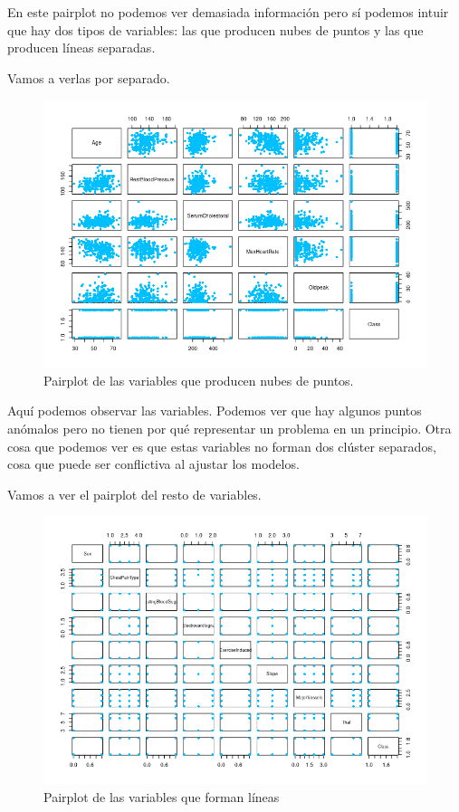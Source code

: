 \documentclass[12pt,a4paper]{article}
\begin{document}
En este pairplot no podemos ver demasiada información pero sí podemos intuir que hay dos tipos de variables: las que producen nubes de puntos y las que producen líneas separadas.

Vamos a verlas por separado.

\begin{figure}[H]
	\centering
	\includegraphics[scale=0.9]{./Imagenes/EDA/Clasificacion/pairplot_seleccionadas.png}
	\caption{Pairplot de las variables que producen nubes de puntos.}
\end{figure}

Aquí podemos observar las variables. Podemos ver que hay algunos puntos anómalos pero no tienen por qué representar un problema en un principio. Otra cosa que podemos ver es que estas variables no forman dos clúster separados, cosa que puede ser conflictiva al ajustar los modelos.

Vamos a ver el pairplot del resto de variables.

\begin{figure}[H]
	\centering
	\includegraphics[scale=0.9]{./Imagenes/EDA/Clasificacion/pairplot_seleccionadas2.png}
	\caption{Pairplot de las variables que forman líneas}
\end{figure}
\end{document}
